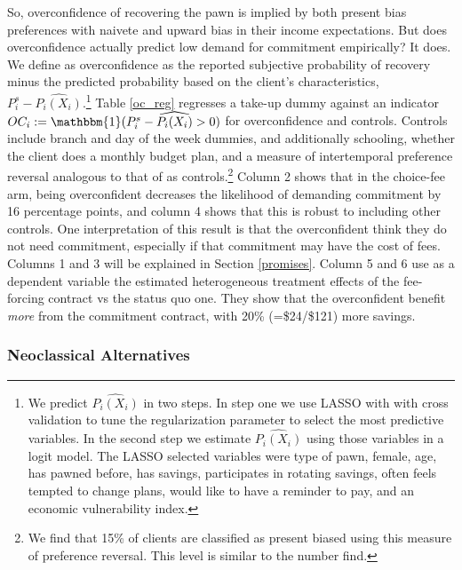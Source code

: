 \documentclass[11pt]{article}
\begin{document}
So, overconfidence of recovering the pawn is implied by both present bias preferences with naivete and upward bias in their income expectations. But does overconfidence actually predict low demand for commitment empirically? It does. We define as overconfidence as the reported subjective probability of recovery minus the predicted probability based on the client's characteristics, $P^s_i-\widehat{P_i(X_i)}$.\footnote{We predict $\widehat{P_i(X_i)}$ in two steps. In step one we use LASSO with with cross validation to tune the regularization parameter to select the most predictive variables. In the second step we estimate $\widehat{P_i(X_i)}$ using those variables in a logit model. The LASSO selected variables were type of pawn, female, age, has pawned before, has savings, participates in rotating savings, often feels tempted to change plans, would like to have a reminder to pay, and an economic vulnerability index.}  Table \ref{oc_reg} regresses a take-up dummy against an indicator $OC_i:=\mathbbm{1}(P^s_i-\widehat{P_i(X_i)}>0)$ for overconfidence and controls. Controls include branch and day of the week dummies, and additionally schooling, whether the client does a monthly budget plan, and a measure of intertemporal preference reversal analogous to that of \cite{Ashraf} as controls.\footnote{We find that 15\% of clients are classified as present biased using this measure of preference reversal. This level is similar to the number \cite{Ashraf} find.} Column 2 shows that in the choice-fee arm, being overconfident decreases the likelihood of demanding commitment by 16 percentage points, and column 4 shows that this is robust to including other controls. One interpretation of this result is that the overconfident think they do not need commitment, especially if that commitment may have the cost of fees. Columns 1 and 3 will be explained in Section \ref{promises}. Column 5 and 6 use as a dependent variable the estimated heterogeneous treatment effects of the fee-forcing contract vs the status quo one. They show that the overconfident benefit \textit{more} from the commitment contract, with 20\% (=\$24/\$121) more savings.  


\subsubsection{Neoclassical Alternatives} \label{neoclasical}
\end{document}
